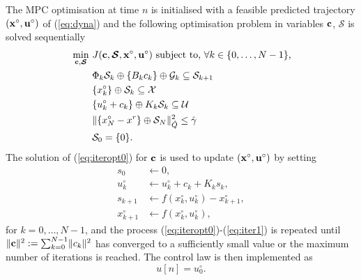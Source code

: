 \documentclass[a4paper, 10 pt, conference]{IEEEconf}
\def\G{\mathcal{G}}
\def\S{\mathcal{S}}
\def\U{\mathcal{U}}
\def\X{\mathcal{X}}
\def\bgamma{\boldsymbol{\gamma}}
\def\bc{{\bf c}}
\def\bS{\boldsymbol{\mathcal{S}}}
\begin{document}
The MPC optimisation at time $n$ is initialised with a feasible predicted trajectory $({\bf x}^\circ, {\bf u}^\circ)$ of (\ref{eq:dyna})
and the following optimisation problem in variables $\bc$, $\bS$ %
is solved sequentially
\begin{equation}\label{eq:iteropt0}
\begin{alignedat}{2}
&  \min_{\bc,\bS} &  \ &   J(\bc,\bS,{\bf x}^\circ,{\bf u}^\circ) 
\ \text{subject to, $\forall k \in \{0, \ldots, N-1\}$,}
\\ 
& & &
\Phi_k \S_k \oplus \{B_k c_k\} \oplus \G_k \subseteq \S_{k+1}
\\
& & & 
\{x_k^\circ\} \oplus \S_k \subseteq \X 
\\
& & &    \{u_k^\circ+c_k\} \oplus K_k \S_k \subseteq \U 
\\
& & &  \lVert \{ x_N^\circ - x^r\} \oplus \S_N \rVert_{\hat{Q}}^2 \leq \hat{\gamma}
\\
& & &    \S_0 = \{0\}.
\end{alignedat}
\end{equation}
%
The solution of (\ref{eq:iteropt0}) for $\bc$ is used to update $({\bf x}^\circ,{\bf u}^\circ)$ by setting%
%
\begin{subequations}\label{eq:iter1}%
\begin{alignat}{2}
s_0 &\gets 0, 
\\
\label{eq:iter2}
u^\circ_k &\gets u^\circ_k + c_k + K_k s_k, 
\\
\label{eq:iter3}
s_{k+1} &\gets f(x^\circ_k, u^\circ_k) - x^\circ_{k+1}, 
\\
\label{eq:iter4}
x^\circ_{k+1} &\gets f(x^\circ_k, u^\circ_k),  
\end{alignat}
\end{subequations}
for $k = 0, \ldots , N-1$, and the process (\ref{eq:iteropt0})-(\ref{eq:iter1}) is repeated until $\lVert \bc \rVert^2 := \sum_{k=0}^{N-1}\lVert c_k\rVert^2$ has converged to a sufficiently small value or the maximum number of iterations is reached. 
%
The control law is then implemented as
\begin{equation}
\label{eq:step_update1}   
u[n] = u^\circ_{0}.
\end{equation}
%
\end{document}
